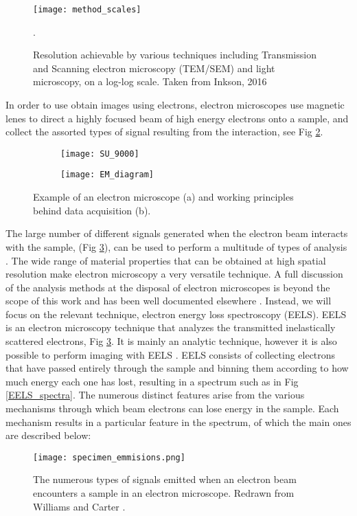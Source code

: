 \begin{figure}
	\centering
	\texttt{[image: method\_scales]}
	\caption{Resolution achievable by various techniques including Transmission and Scanning electron microscopy (TEM/SEM) and light microscopy, on a log-log scale.  Taken from Inkson, 2016 \cite{inkson_2_2016}}.
	\label{method_scales}
	
\end{figure}


In order to use obtain images using electrons, electron microscopes use magnetic lenes to direct a highly focused beam of high energy electrons onto a sample, and collect the assorted types of signal resulting from the interaction, see Fig \ref{em_diagram}.


\begin{figure}
\begin{subfigure}{0.45\textwidth}
	\texttt{[image: SU\_9000]}
	\caption{}
\end{subfigure}
\hfill
\begin{subfigure}{0.45\textwidth}
	\texttt{[image: EM\_diagram]}
	\caption{}
\end{subfigure}
	\caption{Example of an electron microscope (a) and working principles behind data acquisition (b). }
	\label{em_diagram}
\end{figure}

The large number of different signals generated when the electron beam interacts with the sample, (Fig \ref{specimen_emmisions}), can be used to perform a multitude of types of analysis \cite{williams_transmission_2008}. The wide range of material properties that can be obtained at high spatial resolution make electron microscopy  a very versatile technique. A full discussion of the analysis methods at the disposal of electron microscopes is beyond the scope of this work and has been well documented elsewhere \cite{goldstein_electron_2003,Egerton,williams_transmission_2008,reimer_electron_1998}.  Instead, we will focus on the relevant technique, electron energy loss spectroscopy (EELS).  EELS is an electron microscopy technique that analyzes the transmitted inelastically scattered electrons, Fig \ref{specimen_emmisions}\cite{Egerton}.  It is mainly an analytic technique, however it is also possible to perform imaging with EELS \cite{varela_stem-eels_2012}.  EELS consists of collecting electrons that have passed entirely through the sample and binning them according to how much energy each one has lost, resulting in a spectrum such as in Fig \ref{EELS_spectra}.  The numerous distinct features arise from the various mechanisms through which beam electrons can lose energy in the sample.  Each mechanism results in a particular feature in the spectrum, of which the main ones are described below:
\begin{figure}
	\centering
	\texttt{[image: specimen\_emmisions.png]}
	\caption{The numerous types of signals emitted when an electron beam encounters a sample in an electron microscope.   Redrawn from Williams and Carter \cite{williams_transmission_2008}.  }
	\label{specimen_emmisions}
\end{figure}

